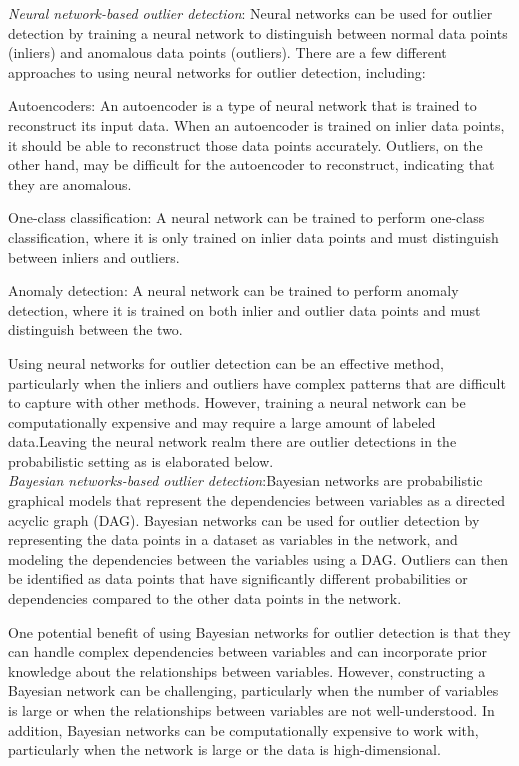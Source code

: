 \documentclass[11pt]{article}
\theoremstyle{definition}
\begin{document}
\textit{Neural network-based outlier detection}: Neural networks can be used for outlier detection by training a neural network to distinguish between normal data points (inliers) and anomalous data points (outliers). There are a few different approaches to using neural networks for outlier detection, including:

Autoencoders: An autoencoder is a type of neural network that is trained to reconstruct its input data. When an autoencoder is trained on inlier data points, it should be able to reconstruct those data points accurately. Outliers, on the other hand, may be difficult for the autoencoder to reconstruct, indicating that they are anomalous.

One-class classification: A neural network can be trained to perform one-class classification, where it is only trained on inlier data points and must distinguish between inliers and outliers.

Anomaly detection: A neural network can be trained to perform anomaly detection, where it is trained on both inlier and outlier data points and must distinguish between the two.

Using neural networks for outlier detection can be an effective method, particularly when the inliers and outliers have complex patterns that are difficult to capture with other methods. However, training a neural network can be computationally expensive and may require a large amount of labeled data.Leaving the neural network realm there are outlier detections in the probabilistic  setting as is elaborated below.\\

\textit{Bayesian networks-based outlier detection}:Bayesian networks are probabilistic graphical models that represent the dependencies between variables as a directed acyclic graph (DAG). Bayesian networks can be used for outlier detection by representing the data points in a dataset as variables in the network, and modeling the dependencies between the variables using a DAG. Outliers can then be identified as data points that have significantly different probabilities or dependencies compared to the other data points in the network.

One potential benefit of using Bayesian networks for outlier detection is that they can handle complex dependencies between variables and can incorporate prior knowledge about the relationships between variables. However, constructing a Bayesian network can be challenging, particularly when the number of variables is large or when the relationships between variables are not well-understood. In addition, Bayesian networks can be computationally expensive to work with, particularly when the network is large or the data is high-dimensional.\\
\end{document}

